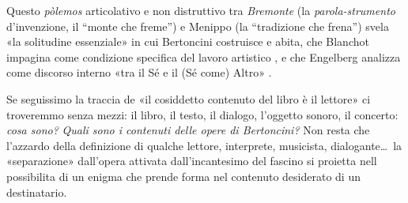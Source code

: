 Questo \emph{pòlemos} articolativo e non distruttivo tra \emph{Bremonte} (la
\emph{parola-strumento} d'invenzione, il “monte che freme”) e Menippo (la
“tradizione che frena”) svela «la solitudine essenziale» in cui Bertoncini
costruisce e abita, che Blanchot impagina come condizione
specifica del lavoro artistico \cite{blanchot82}, e che Engelberg analizza come
discorso interno «tra il Sé e il (Sé come) Altro» \cite{engelberg01}.

Se seguissimo la traccia de «il cosiddetto contenuto del libro è il lettore» ci troveremmo senza mezzi:
 il libro, il testo, il dialogo, l'oggetto sonoro,
il concerto: \emph{cosa sono?} \emph{Quali sono i contenuti delle opere di Bertoncini?} Non resta che l'azzardo della definizione di qualche lettore,
interprete, musicista, dialogante\ldots~la «separazione» dall'opera attivata
dall'incantesimo del fascino si proietta nell possibilita di un enigma che prende
forma nel contenuto desiderato di un destinatario.


